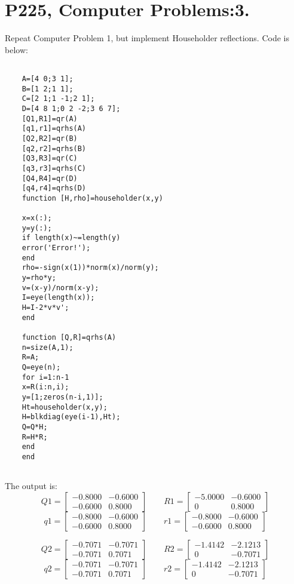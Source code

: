 \documentclass[UTF8]{ctexart}
\begin{document}
\section{P225, Computer Problems:3.}
Repeat Computer Problem 1, but implement Householder reflections.
Code is below:
   \begin{centering}
	\begin{lstlisting}	
	
	A=[4 0;3 1];
	B=[1 2;1 1];
	C=[2 1;1 -1;2 1];
	D=[4 8 1;0 2 -2;3 6 7];
	[Q1,R1]=qr(A)
	[q1,r1]=qrhs(A)
	[Q2,R2]=qr(B)
	[q2,r2]=qrhs(B)
	[Q3,R3]=qr(C)
	[q3,r3]=qrhs(C)
	[Q4,R4]=qr(D)
	[q4,r4]=qrhs(D)
	function [H,rho]=householder(x,y)
	
	x=x(:);
	y=y(:);
	if length(x)~=length(y)
	error('Error!');
	end
	rho=-sign(x(1))*norm(x)/norm(y);
	y=rho*y;
	v=(x-y)/norm(x-y);
	I=eye(length(x));
	H=I-2*v*v';
	end
	
	function [Q,R]=qrhs(A)   	
	n=size(A,1);   	
	R=A;   	
	Q=eye(n);   	
	for i=1:n-1   	
	x=R(i:n,i);	
	y=[1;zeros(n-i,1)];  	
	Ht=householder(x,y);   	
	H=blkdiag(eye(i-1),Ht);   	
	Q=Q*H;   	
	R=H*R;   	
	end
	end
	
	\end{lstlisting}   \end{centering}
The output is:
$$Q1=\begin{bmatrix}
-0.8000  & -0.6000\\
-0.6000  &  0.8000
\end{bmatrix}\qquad
R1= \begin{bmatrix}
-5.0000  & -0.6000\\
0   & 0.8000
\end{bmatrix} $$
$$q1 =\begin{bmatrix}
-0.8000  & -0.6000\\
-0.6000  &  0.8000
\end{bmatrix}\qquad
r1=\begin{bmatrix}	
-0.8000  & -0.6000\\
-0.6000  &  0.8000
\end{bmatrix}$$

$$Q2=\begin{bmatrix}

-0.7071  &  -0.7071\\
-0.7071  & 0.7071
\end{bmatrix}\qquad
R2= \begin{bmatrix}
-1.4142  &  -2.1213\\
0   & -0.7071
\end{bmatrix} $$
$$q2 =\begin{bmatrix}
-0.7071  & -0.7071\\
-0.7071   & 0.7071

\end{bmatrix}\qquad
r2=\begin{bmatrix}	
-1.4142 &  -2.1213\\
0   &-0.7071
\end{bmatrix}$$    
\end{document}
